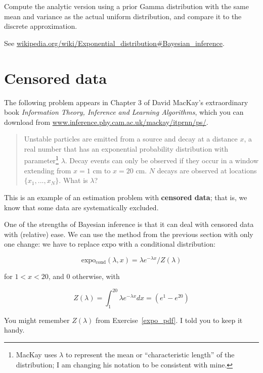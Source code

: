 \documentclass[12pt]{book}
\begin{document}
\begin{ex}

Compute the analytic version using a prior Gamma distribution with the
same mean and variance as the actual uniform distribution, and compare
it to the discrete approximation.

See \url{wikipedia.org/wiki/Exponential_distribution#Bayesian_inference}.

\end{ex}


\section{Censored data}
\label{censored}

The following problem appears in Chapter 3 of David MacKay's
extraordinary book {\em Information Theory, Inference and Learning
  Algorithms}, which you can download from
\url{www.inference.phy.cam.ac.uk/mackay/itprnn/ps/}.

\begin{quote}

Unstable particles are emitted from a source and decay at a distance
$x$, a real number that has an exponential probability distribution
with parameter\footnote{MacKay uses $\lambda$ to represent the mean or
  ``characteristic length'' of the distribution; I am changing his
  notation to be consistent with mine.} $\lambda$.  Decay events can
only be observed if they occur in a window extending from $x=1$ cm to
$x=20$ cm.  $N$ decays are observed at locations $\{ x_1, ... , x_N
\}$.  What is $\lambda$?

\end{quote}

This is an example of an estimation problem with {\bf censored data};
that is, we know that some data are systematically excluded.

One of the strengths of Bayesian inference is that it can deal with
censored data with (relative) ease.  We can use the method from the
previous section with only one change: we have to replace
$\mathrm{expo}$ with a conditional distribution:

\[ \mathrm{expo_{cond}}(\lambda, x) = \lambda e^{-\lambda x} / Z(\lambda)  \]

for $1 < x < 20$, and 0 otherwise, with

\[ Z(\lambda) = \int_1^{20} \lambda e^{-\lambda x} dx = (e^{1} - e^{20} ) \]

You might remember $Z(\lambda)$ from Exercise~\ref{expo_pdf}.  I told
you to keep it handy.
\end{document}
